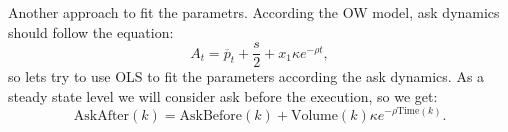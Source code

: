 \documentclass[aspectratio=169]{beamer}
\begin{document}
\begin{frame}{Another approach to fit the parametrs.}
    According the OW model, ask dynamics should follow the equation:
    \begin{equation*}
        A_t = \overline p _t + \frac{s}{2} + x_1 \kappa e^{- \rho t},
    \end{equation*}
    so lets try to use OLS to fit the parameters according the ask dynamics. As a steady state level we will consider ask before the execution, so we get:
    \begin{equation*}
        \textrm{AskAfter}(k) = \textrm{AskBefore}(k) + \textrm{Volume}(k) \kappa e^{- \rho \textrm{Time}(k)}.
    \end{equation*}
\end{frame}
\end{document}
